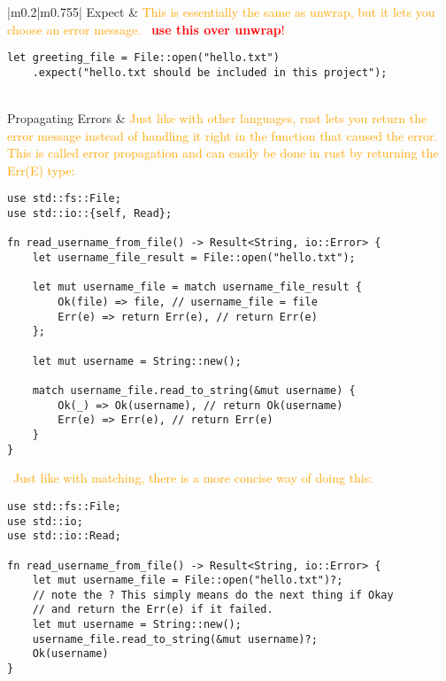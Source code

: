 \documentclass[main.tex,fontsize=8pt,paper=a4,paper=portrait,DIV=calc,]{scrartcl}
\begin{document}
\begin{table}[ht!]
\begin{tabular}{|m{0.2\linewidth}|m{0.755\linewidth}|}
\hline
Expect & 
\textcolor{orange}{This is essentially the same as unwrap, but it lets you choose an error message.}\newline
\, \newline
\large\textcolor{red}{\textbf{use this over unwrap}!}\newline
\normalsize\begin{lstlisting}
let greeting_file = File::open("hello.txt")
    .expect("hello.txt should be included in this project");
\end{lstlisting}\\
\hline
Propagating Errors & 
\textcolor{orange}{Just like with other languages, rust lets you return the error message instead of handling it right in the function that caused the error.\newline
This is called error propagation and can easily be done in rust by returning the Err(E) type:}\newline
\begin{lstlisting}
use std::fs::File;
use std::io::{self, Read};

fn read_username_from_file() -> Result<String, io::Error> {
    let username_file_result = File::open("hello.txt");

    let mut username_file = match username_file_result {
        Ok(file) => file, // username_file = file
        Err(e) => return Err(e), // return Err(e)
    };

    let mut username = String::new();

    match username_file.read_to_string(&mut username) {
        Ok(_) => Ok(username), // return Ok(username)
        Err(e) => Err(e), // return Err(e)
    }
}
\end{lstlisting}
\, \newline
\textcolor{orange}{Just like with matching, there is a more concise way of doing this:}\newline
\begin{lstlisting}
use std::fs::File;
use std::io;
use std::io::Read;

fn read_username_from_file() -> Result<String, io::Error> {
    let mut username_file = File::open("hello.txt")?;
    // note the ? This simply means do the next thing if Okay
    // and return the Err(e) if it failed.
    let mut username = String::new(); 
    username_file.read_to_string(&mut username)?;
    Ok(username)
}


\end{lstlisting}
\end{tabular}
\end{table}
\end{document}
